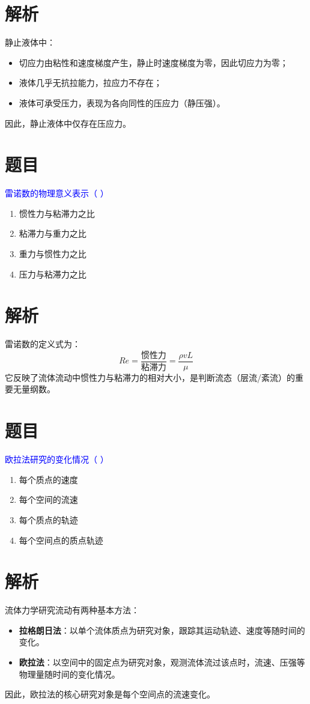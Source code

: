 \documentclass[11pt,a4paper]{article}
\begin{document}
\section*{解析}
静止液体中：
\begin{itemize}
    \item 切应力由粘性和速度梯度产生，静止时速度梯度为零，因此切应力为零；
    \item 液体几乎无抗拉能力，拉应力不存在；
    \item 液体可承受压力，表现为各向同性的压应力（静压强）。
\end{itemize}
因此，静止液体中仅存在压应力。


\section*{题目}
\textcolor{blue}{雷诺数的物理意义表示（ ）}
\begin{enumerate}
    \item[A] 惯性力与粘滞力之比
    \item[B] 粘滞力与重力之比
    \item[C] 重力与惯性力之比
    \item[D] 压力与粘滞力之比
\end{enumerate}

\section*{解析}
雷诺数的定义式为：
\[
Re = \frac{\text{惯性力}}{\text{粘滞力}} = \frac{\rho v L}{\mu}
\]
它反映了流体流动中惯性力与粘滞力的相对大小，是判断流态（层流/紊流）的重要无量纲数。


\section*{题目}
\textcolor{blue}{欧拉法研究的变化情况（ ）}
\begin{enumerate}
    \item[A] 每个质点的速度
    \item[B] 每个空间的流速
    \item[C] 每个质点的轨迹
    \item[D] 每个空间点的质点轨迹
\end{enumerate}

\section*{解析}
流体力学研究流动有两种基本方法：
\begin{itemize}
    \item \textbf{拉格朗日法}：以单个流体质点为研究对象，跟踪其运动轨迹、速度等随时间的变化。
    \item \textbf{欧拉法}：以空间中的固定点为研究对象，观测流体流过该点时，流速、压强等物理量随时间的变化情况。
\end{itemize}
因此，欧拉法的核心研究对象是每个空间点的流速变化。
\end{document}
